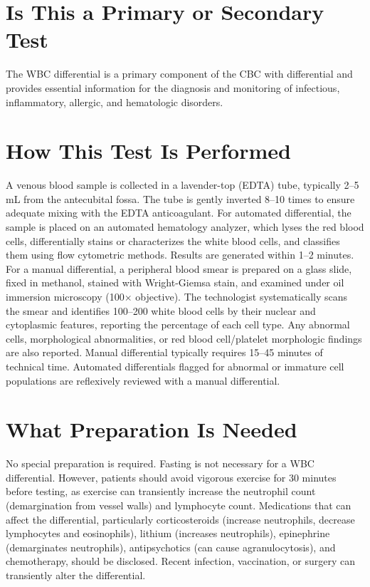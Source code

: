 \section*{Is This a Primary or Secondary Test}
The WBC differential is a primary component of the CBC with differential and provides essential information for the diagnosis and monitoring of infectious, inflammatory, allergic, and hematologic disorders.

\section*{How This Test Is Performed}
A venous blood sample is collected in a lavender-top (EDTA) tube, typically 2--5 mL from the antecubital fossa. The tube is gently inverted 8--10 times to ensure adequate mixing with the EDTA anticoagulant. For automated differential, the sample is placed on an automated hematology analyzer, which lyses the red blood cells, differentially stains or characterizes the white blood cells, and classifies them using flow cytometric methods. Results are generated within 1--2 minutes. For a manual differential, a peripheral blood smear is prepared on a glass slide, fixed in methanol, stained with Wright-Giemsa stain, and examined under oil immersion microscopy (100$\times$ objective). The technologist systematically scans the smear and identifies 100--200 white blood cells by their nuclear and cytoplasmic features, reporting the percentage of each cell type. Any abnormal cells, morphological abnormalities, or red blood cell/platelet morphologic findings are also reported. Manual differential typically requires 15--45 minutes of technical time. Automated differentials flagged for abnormal or immature cell populations are reflexively reviewed with a manual differential.

\section*{What Preparation Is Needed}
No special preparation is required. Fasting is not necessary for a WBC differential. However, patients should avoid vigorous exercise for 30 minutes before testing, as exercise can transiently increase the neutrophil count (demargination from vessel walls) and lymphocyte count. Medications that can affect the differential, particularly corticosteroids (increase neutrophils, decrease lymphocytes and eosinophils), lithium (increases neutrophils), epinephrine (demarginates neutrophils), antipsychotics (can cause agranulocytosis), and chemotherapy, should be disclosed. Recent infection, vaccination, or surgery can transiently alter the differential.

